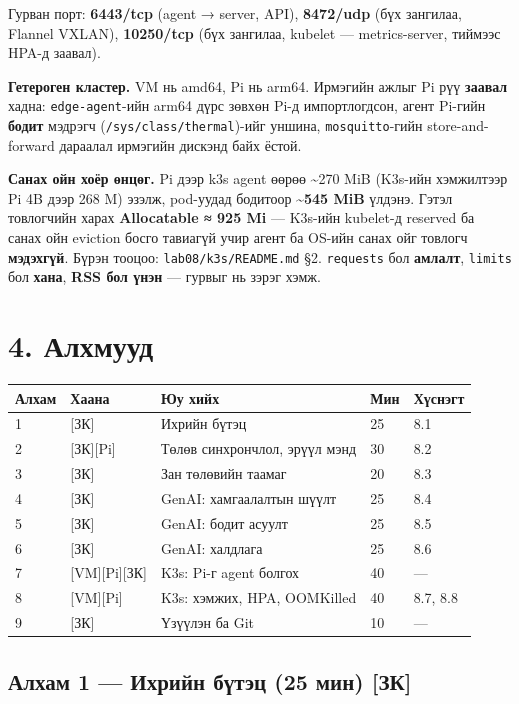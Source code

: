 Гурван порт: \textbf{6443/tcp} (agent → server, API), \textbf{8472/udp} (бүх зангилаа, Flannel VXLAN), \textbf{10250/tcp} (бүх зангилаа, kubelet --- metrics-server, тиймээс HPA-д заавал).

\textbf{Гетероген кластер.} VM нь amd64, Pi нь arm64. Ирмэгийн ажлыг Pi рүү \textbf{заавал} хадна: \texttt{edge-agent}-ийн arm64 дүрс зөвхөн Pi-д импортлогдсон, агент Pi-гийн \textbf{бодит} мэдрэгч (\texttt{/\allowbreak{}sys/\allowbreak{}class/\allowbreak{}thermal})-ийг уншина, \texttt{mosquitto}-гийн store-and-forward дараалал ирмэгийн дискэнд байх ёстой.

\textbf{Санах ойн хоёр өнцөг.} Pi дээр k3s agent өөрөө \textasciitilde270 MiB (K3s-ийн хэмжилтээр Pi 4B дээр 268 M) эзэлж, pod-уудад бодитоор \textbf{\textasciitilde545 MiB} үлдэнэ. Гэтэл товлогчийн харах \textbf{Allocatable ≈ 925 Mi} --- K3s-ийн kubelet-д reserved ба санах ойн eviction босго тавиагүй учир агент ба OS-ийн санах ойг товлогч \textbf{мэдэхгүй}. Бүрэн тооцоо: \texttt{lab08/\allowbreak{}k3s/\allowbreak{}README.\allowbreak{}md} §2. \texttt{requests} бол \textbf{амлалт}, \texttt{limits} бол \textbf{хана}, \textbf{RSS бол үнэн} --- гурвыг нь зэрэг хэмж.

\hypertarget{ux430ux43bux445ux43cux443ux443ux434}{%
\section{4. Алхмууд}\label{ux430ux43bux445ux43cux443ux443ux434}}

\begingroup\scriptsize\begin{longtable}[]{@{}lllll@{}}
\toprule
Алхам & Хаана & Юу хийх & Мин & Хүснэгт\tabularnewline
\midrule
\endhead
1 & {[}ЗК{]} & Ихрийн бүтэц & 25 & 8.1\tabularnewline
2 & {[}ЗК{]}{[}Pi{]} & Төлөв синхрончлол, эрүүл мэнд & 30 & 8.2\tabularnewline
3 & {[}ЗК{]} & Зан төлөвийн таамаг & 20 & 8.3\tabularnewline
4 & {[}ЗК{]} & GenAI: хамгаалалтын шүүлт & 25 & 8.4\tabularnewline
5 & {[}ЗК{]} & GenAI: бодит асуулт & 25 & 8.5\tabularnewline
6 & {[}ЗК{]} & GenAI: халдлага & 25 & 8.6\tabularnewline
7 & {[}VM{]}{[}Pi{]}{[}ЗК{]} & K3s: Pi-г agent болгох & 40 & ---\tabularnewline
8 & {[}VM{]}{[}Pi{]} & K3s: хэмжих, HPA, OOMKilled & 40 & 8.7, 8.8\tabularnewline
9 & {[}ЗК{]} & Үзүүлэн ба Git & 10 & ---\tabularnewline
\bottomrule
\end{longtable}\endgroup

\hypertarget{ux430ux43bux445ux430ux43c-1-ux438ux445ux440ux438ux439ux43d-ux431ux4afux442ux44dux446-25-ux43cux438ux43d-ux437ux43a}{%
\subsection{Алхам 1 --- Ихрийн бүтэц (25 мин) {[}ЗК{]}}\label{ux430ux43bux445ux430ux43c-1-ux438ux445ux440ux438ux439ux43d-ux431ux4afux442ux44dux446-25-ux43cux438ux43d-ux437ux43a}}

